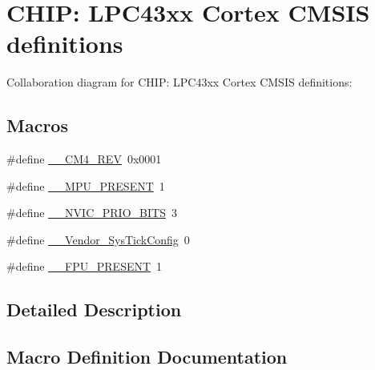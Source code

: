\hypertarget{group___c_m_s_i_s__43_x_x___c_o_m_m_o_n}{}\section{C\+H\+IP\+: L\+P\+C43xx Cortex C\+M\+S\+IS definitions}
\label{group___c_m_s_i_s__43_x_x___c_o_m_m_o_n}
Collaboration diagram for C\+H\+IP\+: L\+P\+C43xx Cortex C\+M\+S\+IS definitions\+:
\subsection*{Macros}
\begin{DoxyCompactItemize}
\item 
\#define \hyperlink{group___c_m_s_i_s__43_x_x___c_o_m_m_o_n_ga45a97e4bb8b6ce7c334acc5f45ace3ba}{\+\_\+\+\_\+\+C\+M4\+\_\+\+R\+EV}~0x0001
\item 
\#define \hyperlink{group___c_m_s_i_s__43_x_x___c_o_m_m_o_n_ga4127d1b31aaf336fab3d7329d117f448}{\+\_\+\+\_\+\+M\+P\+U\+\_\+\+P\+R\+E\+S\+E\+NT}~1
\item 
\#define \hyperlink{group___c_m_s_i_s__43_x_x___c_o_m_m_o_n_gae3fe3587d5100c787e02102ce3944460}{\+\_\+\+\_\+\+N\+V\+I\+C\+\_\+\+P\+R\+I\+O\+\_\+\+B\+I\+TS}~3
\item 
\#define \hyperlink{group___c_m_s_i_s__43_x_x___c_o_m_m_o_n_gab58771b4ec03f9bdddc84770f7c95c68}{\+\_\+\+\_\+\+Vendor\+\_\+\+Sys\+Tick\+Config}~0
\item 
\#define \hyperlink{group___c_m_s_i_s__43_x_x___c_o_m_m_o_n_gac1ba8a48ca926bddc88be9bfd7d42641}{\+\_\+\+\_\+\+F\+P\+U\+\_\+\+P\+R\+E\+S\+E\+NT}~1
\end{DoxyCompactItemize}


\subsection{Detailed Description}


\subsection{Macro Definition Documentation}
\mbox{\label{group___c_m_s_i_s__43_x_x___c_o_m_m_o_n_ga45a97e4bb8b6ce7c334acc5f45ace3ba}} 
